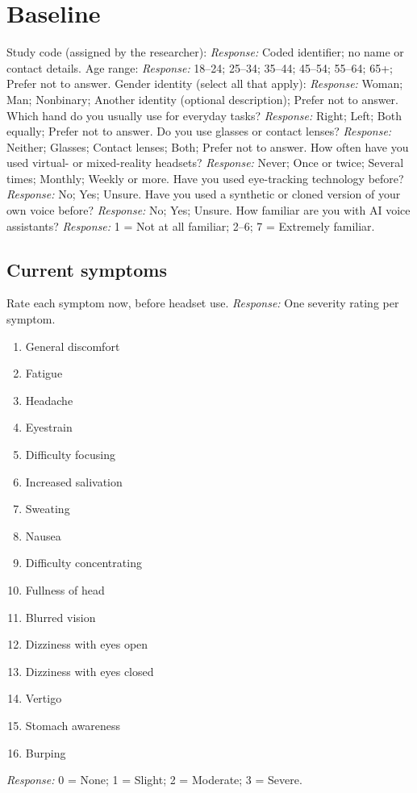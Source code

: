 \section{Baseline}
Study code (assigned by the researcher):
\textit{Response:} Coded identifier; no name or contact details.
Age range:
\textit{Response:} 18--24; 25--34; 35--44; 45--54; 55--64; 65+; Prefer not to answer.
Gender identity (select all that apply):
\textit{Response:} Woman; Man; Nonbinary; Another identity (optional description); Prefer not to answer.
Which hand do you usually use for everyday tasks?
\textit{Response:} Right; Left; Both equally; Prefer not to answer.
Do you use glasses or contact lenses?
\textit{Response:} Neither; Glasses; Contact lenses; Both; Prefer not to answer.
How often have you used virtual- or mixed-reality headsets?
\textit{Response:} Never; Once or twice; Several times; Monthly; Weekly or more.
Have you used eye-tracking technology before?
\textit{Response:} No; Yes; Unsure.
Have you used a synthetic or cloned version of your own voice before?
\textit{Response:} No; Yes; Unsure.
How familiar are you with AI voice assistants?
\textit{Response:} 1 = Not at all familiar; 2--6; 7 = Extremely familiar.
\subsection{Current symptoms}
Rate each symptom now, before headset use.
\textit{Response:} One severity rating per symptom.
\begin{enumerate}
\item General discomfort
\item Fatigue
\item Headache
\item Eyestrain
\item Difficulty focusing
\item Increased salivation
\item Sweating
\item Nausea
\item Difficulty concentrating
\item Fullness of head
\item Blurred vision
\item Dizziness with eyes open
\item Dizziness with eyes closed
\item Vertigo
\item Stomach awareness
\item Burping
\end{enumerate}
\textit{Response:} 0 = None; 1 = Slight; 2 = Moderate; 3 = Severe.
